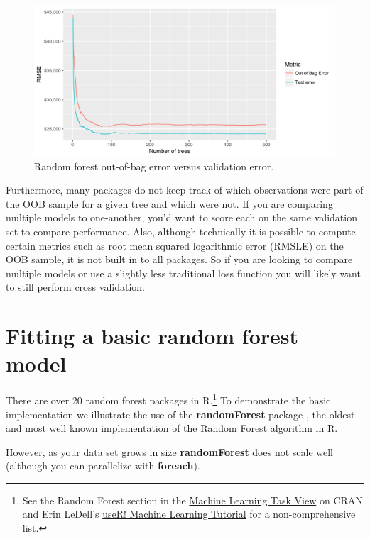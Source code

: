 \documentclass[]{book}
\let\rmarkdownfootnote\footnote%
\def\footnote{\protect\rmarkdownfootnote}
\theoremstyle{definition}
\theoremstyle{definition}
\theoremstyle{definition}
\theoremstyle{remark}
\begin{document}
\begin{figure}

{\centering \includegraphics[width=0.7\linewidth,height=0.7\textheight]{illustrations/oob-error-compare-1} 

}

\caption{Random forest out-of-bag error versus validation error.}\label{fig:rf-oob-example-image}
\end{figure}

Furthermore, many packages do not keep track of which observations were
part of the OOB sample for a given tree and which were not. If you are
comparing multiple models to one-another, you'd want to score each on
the same validation set to compare performance. Also, although
technically it is possible to compute certain metrics such as root mean
squared logarithmic error (RMSLE) on the OOB sample, it is not built in
to all packages. So if you are looking to compare multiple models or use
a slightly less traditional loss function you will likely want to still
perform cross validation.

\hypertarget{fitting-a-basic-random-forest-model}{%
\section{Fitting a basic random forest
model}\label{fitting-a-basic-random-forest-model}}

There are over 20 random forest packages in R.\footnote{See the Random
  Forest section in the
  \href{https://CRAN.R-project.org/view=MachineLearning}{Machine
  Learning Task View} on CRAN and Erin LeDell's
  \href{https://koalaverse.github.io/machine-learning-in-R/random-forest.html\#random-forest-software-in-r}{useR!
  Machine Learning Tutorial} for a non-comprehensive list.} To
demonstrate the basic implementation we illustrate the use of the
\textbf{randomForest} package \citep{R-randomForest}, the oldest and
most well known implementation of the Random Forest algorithm in R.

\begin{tip}
However, as your data set grows in size \textbf{randomForest} does not
scale well (although you can parallelize with \textbf{foreach}).
\end{tip}
\end{document}

